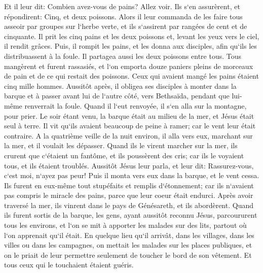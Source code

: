 \verse Et il leur dit: Combien avez-vous de pains? Allez voir. Ils s`en assurèrent, et répondirent: Cinq, et deux poissons. 
\verse Alors il leur commanda de les faire tous asseoir par groupes sur l`herbe verte, 
\verse et ils s`assirent par rangées de cent et de cinquante. 
\verse Il prit les cinq pains et les deux poissons et, levant les yeux vers le ciel, il rendit grâces. Puis, il rompit les pains, et les donna aux disciples, afin qu`ils les distribuassent à la foule. Il partagea aussi les deux poissons entre tous. 
\verse Tous mangèrent et furent rassasiés, 
\verse et l`on emporta douze paniers pleins de morceaux de pain et de ce qui restait des poissons. 
\verse Ceux qui avaient mangé les pains étaient cinq mille hommes. 
\verse Aussitôt après, il obligea ses disciples à monter dans la barque et à passer avant lui de l`autre côté, vers Bethsaïda, pendant que lui-même renverrait la foule. 
\verse Quand il l`eut renvoyée, il s`en alla sur la montagne, pour prier. 
\verse Le soir étant venu, la barque était au milieu de la mer, et Jésus était seul à terre. 
\verse Il vit qu`ils avaient beaucoup de peine à ramer; car le vent leur était contraire. A la quatrième veille de la nuit environ, il alla vers eux, marchant sur la mer, et il voulait les dépasser. 
\verse Quand ils le virent marcher sur la mer, ils crurent que c`étaient un fantôme, et ils poussèrent des cris; 
\verse car ils le voyaient tous, et ils étaient troublés. Aussitôt Jésus leur parla, et leur dit: Rassurez-vous, c`est moi, n`ayez pas peur! 
\verse Puis il monta vers eux dans la barque, et le vent cessa. Ils furent en eux-même tout stupéfaits et remplis d`étonnement; 
\verse car ils n`avaient pas compris le miracle des pains, parce que leur coeur était endurci. 
\verse Après avoir traversé la mer, ils vinrent dans le pays de Génésareth, et ils abordèrent. 
\verse Quand ils furent sortis de la barque, les gens, ayant aussitôt reconnu Jésus, 
\verse parcoururent tous les environs, et l`on se mit à apporter les malades sur des lits, partout où l`on apprenait qu`il était. 
\verse En quelque lieu qu`il arrivât, dans les villages, dans les villes ou dans les campagnes, on mettait les malades sur les places publiques, et on le priait de leur permettre seulement de toucher le bord de son vêtement. Et tous ceux qui le touchaient étaient guéris. 

\chapter{}

